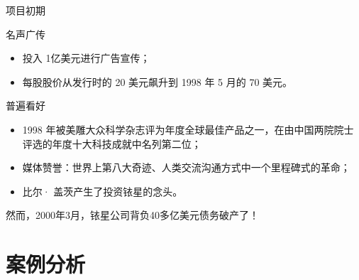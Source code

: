 \documentclass[handout]{ctexbeamer}
\begin{document}
\begin{frame}{项目初期}
	\begin{block}{名声广传}
		\begin{itemize}
			\item 投入 1亿美元进行广告宣传；
			\item 每股股价从发行时的 20 美元飙升到 1998 年 5 月的 70 美元。
		\end{itemize}
	\end{block}
	\pause
	\begin{block}{普遍看好}
		\begin{itemize}
			\item 1998 年被美雕大众科学杂志评为年度全球最佳产品之一，在由中国两院院士评选的年度十大科技成就中名列第二位；
			\item 媒体赞誉：世界上第八大奇迹、人类交流沟通方式中一个里程碑式的革命；
			\item 比尔· 盖茨产生了投资铱星的念头。
		\end{itemize}
	\end{block}
\end{frame}

\begin{frame}[standout]
	然而，2000年3月，铱星公司背负40多亿美元债务破产了！
\end{frame}

\section{案例分析}%
\label{sec:案例分析}
\end{document}
